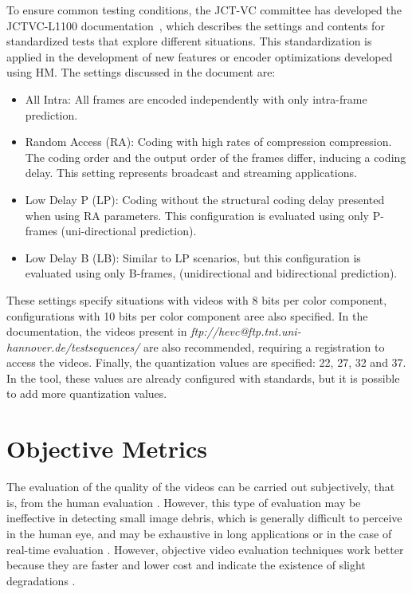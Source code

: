 \documentclass[journal]{IEEEtran}
\begin{document}

To ensure common testing conditions, the JCT-VC committee has developed the JCTVC-L1100 documentation~\cite{Bossen:13}, which describes the settings and contents for standardized tests that explore different situations. This standardization is applied in the development of new features or encoder optimizations developed using HM. The settings discussed in the document are:

\begin{itemize}

  \item All Intra: All frames are encoded independently with only intra-frame prediction.
  \item Random Access (RA): Coding with high rates of compression compression. The coding order and the output order of the frames differ, inducing a coding delay. This setting represents broadcast and streaming applications.
  \item Low Delay P (LP): Coding without the structural coding delay presented when using RA parameters. This configuration is evaluated using only P-frames (uni-directional prediction).
  \item Low Delay B (LB): Similar to LP scenarios, but this configuration is evaluated using only B-frames, (unidirectional and bidirectional prediction).

\end{itemize}

These settings specify situations with videos with 8 bits per color component, configurations with 10 bits per color component aree also specified. In the documentation, the videos present in \emph{ftp://hevc@ftp.tnt.uni-hannover.de/testsequences/} are also recommended, requiring a registration to access the videos. Finally, the quantization values are specified: 22, 27, 32 and 37. In the tool, these values are already configured with standards, but it is possible to add more quantization values.

\section{Objective Metrics}

The evaluation of the quality of the videos can be carried out subjectively, that is, from the human evaluation \cite{itu:99}. However, this type of evaluation may be ineffective in detecting small image debris, which is generally difficult to perceive in the human eye, and may be exhaustive in long applications or in the case of real-time evaluation \cite{estrada:09}\cite{regis:12}. However, objective video evaluation techniques work better because they are faster and lower cost and indicate the existence of slight degradations \cite{regis:12}.
\end{document}
